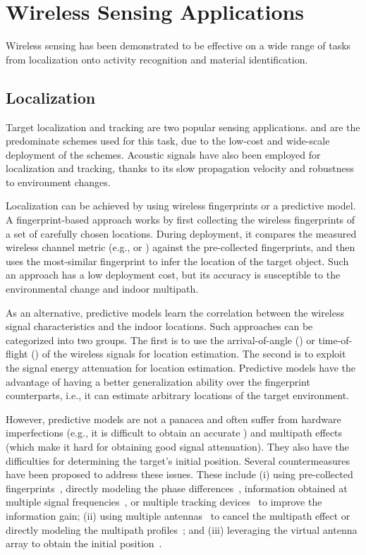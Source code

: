 \section{Wireless Sensing Applications}
Wireless sensing has been demonstrated to be effective on a wide range of tasks from localization onto activity recognition and material
identification.


\subsection{Localization} Target localization and tracking are two popular sensing applications. \WiFi and \RFID are the predominate schemes used for this task, due to the low-cost and wide-scale deployment of the schemes.
Acoustic signals have also been employed for localization and tracking, thanks to its slow propagation velocity and robustness to
environment changes.

 Localization can be achieved by using wireless fingerprints or a predictive model. A fingerprint-based approach works
by first collecting the wireless fingerprints of a set of carefully chosen locations. During deployment, it compares the measured wireless
channel metric (e.g., \RSSI or \CSI) against the pre-collected fingerprints, and then uses the most-similar fingerprint to infer the
location of the target object. Such an approach has a low deployment cost, but its accuracy is susceptible to the environmental change and
indoor multipath.

As an alternative, predictive models learn the correlation between the wireless signal characteristics and the indoor locations. Such
approaches can be categorized into two groups. The first is to use the arrival-of-angle (\AoA) or time-of-flight (\ToF) of the wireless
signals for location estimation. The second is to exploit the signal energy attenuation for location estimation. Predictive models have the
advantage of having a better generalization ability over the fingerprint counterparts, i.e., it can estimate arbitrary locations of the
target environment.

However, predictive models are not a panacea and often suffer from hardware imperfections (e.g., it is difficult to obtain an accurate
\ToF) and multipath effects (which make it hard for obtaining good signal attenuation). They also have the difficulties for determining the
target's initial position. Several countermeasures have been proposed to address these issues. These include (i) using pre-collected
fingerprints~\cite{Wang2016D}, directly modeling the phase differences~\cite{LLAP},  information obtained at multiple signal
frequencies~\cite{RFind, CAT, Strata}, or multiple tracking devices~\cite{BeepBeep} to improve the information gain; (ii) using multiple
antennas~\cite{Arraytrack, Spotfi} to cancel the multipath effect or directly modeling the multipath profiles~\cite{PinIt}; and (iii)
leveraging the virtual antenna array to obtain the initial position~\cite{Tagoram}.





